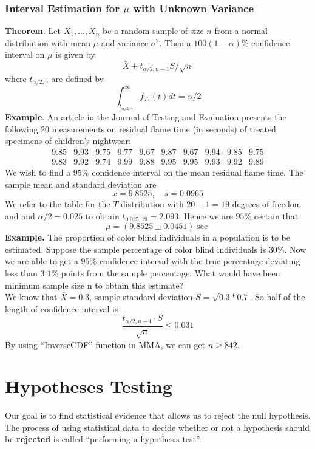 \documentclass[a4paper,12pt]{article}
\begin{document}
\subsubsection{Interval Estimation for $\mu$ with Unknown Variance}
\textbf{Theorem}. Let $X_1, \ldots, X_n$ be a random sample of size $n$ from a normal distribution with mean $\mu$ and variance $\sigma^2$. Then a $100(1-\alpha) \%$ confidence interval on $\mu$ is given by
\begin{equation}
\bar{X} \pm t_{\alpha / 2, n-1} S / \sqrt{n}
\end{equation}
where $t_{\alpha / 2, \gamma}$ are defined by
$$
\int_{t_{\alpha / 2, \gamma}}^{\infty} f_{T_\gamma}(t) d t=\alpha / 2
$$
\textbf{Example}. An article in the Journal of Testing and Evaluation presents the following 20 measurements on residual flame time (in seconds) of treated specimens of children's nightwear:
$$
\begin{array}{llllllllll}
9.85 & 9.93 & 9.75 & 9.77 & 9.67 & 9.87 & 9.67 & 9.94 & 9.85 & 9.75 \\
9.83 & 9.92 & 9.74 & 9.99 & 9.88 & 9.95 & 9.95 & 9.93 & 9.92 & 9.89
\end{array}
$$
We wish to find a $95 \%$ confidence interval on the mean residual flame time. The sample mean and standard deviation are
$$
\bar{x}=9.8525, \quad s=0.0965
$$
We refer to the table for the $T$ distribution with $20-1=19$ degrees of freedom and and $\alpha / 2=0.025$ to obtain $t_{0.025,19}=2.093$. Hence we are $95 \%$ certain that
$$
\mu=(9.8525 \pm 0.0451) \sec
$$
\textbf{Example.} The proportion of color blind individuals in a population is to be estimated. Suppose the sample percentage of color blind individuals is $30\%$. Now we are able to get a $95\%$ confidence interval with the true percentage deviating less than $3.1\%$ points from the sample percentage. What would have been minimum sample size n to obtain this estimate?\\
We know that $\bar{X}=0.3$, sample standard deviation $S=\sqrt{0.3*0.7}$. So half of the length of confidence interval is 
$$\dfrac{t_{\alpha / 2, n-1}\cdot S}{\sqrt{n}} \leq 0.031$$
By using ``InverseCDF'' function in MMA, we can get $n \geq 842$.







\section{Hypotheses Testing}
Our goal is to find statistical evidence that allows us to reject the null
hypothesis. The process of using statistical data to decide whether or not a hypothesis
should be \textbf{rejected} is called ``performing a hypothesis test”.
\end{document}
